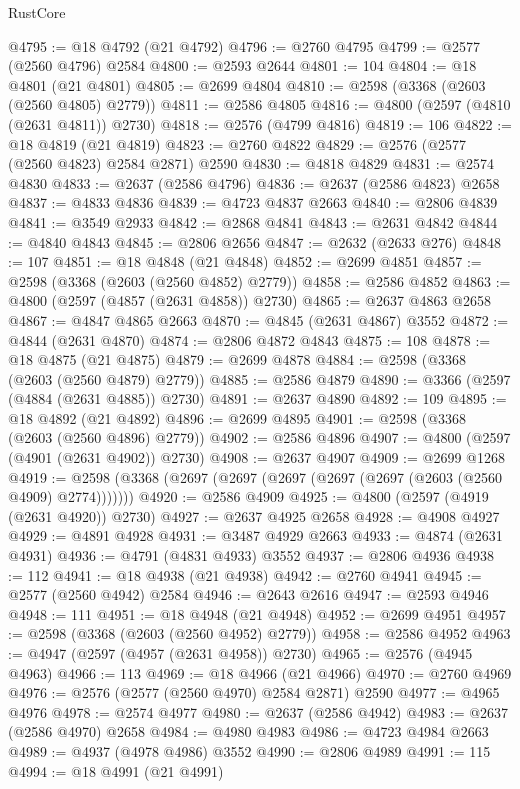 \begin{lexlean}{RustCore}
\begin{coremodule}
@4795 := @18 @4792 (@21 @4792)
@4796 := @2760 @4795
@4799 := @2577 (@2560 @4796) @2584
@4800 := @2593 @2644
@4801 := 104
@4804 := @18 @4801 (@21 @4801)
@4805 := @2699 @4804
@4810 := @2598 (@3368 (@2603 (@2560 @4805) @2779))
@4811 := @2586 @4805
@4816 := @4800 (@2597 (@4810 (@2631 @4811)) @2730)
@4818 := @2576 (@4799 @4816)
@4819 := 106
@4822 := @18 @4819 (@21 @4819)
@4823 := @2760 @4822
@4829 := @2576 (@2577 (@2560 @4823) @2584 @2871) @2590
@4830 := @4818 @4829
@4831 := @2574 @4830
@4833 := @2637 (@2586 @4796)
@4836 := @2637 (@2586 @4823) @2658
@4837 := @4833 @4836
@4839 := @4723 @4837 @2663
@4840 := @2806 @4839
@4841 := @3549 @2933
@4842 := @2868 @4841
@4843 := @2631 @4842
@4844 := @4840 @4843
@4845 := @2806 @2656
@4847 := @2632 (@2633 @276)
@4848 := 107
@4851 := @18 @4848 (@21 @4848)
@4852 := @2699 @4851
@4857 := @2598 (@3368 (@2603 (@2560 @4852) @2779))
@4858 := @2586 @4852
@4863 := @4800 (@2597 (@4857 (@2631 @4858)) @2730)
@4865 := @2637 @4863 @2658
@4867 := @4847 @4865 @2663
@4870 := @4845 (@2631 @4867) @3552
@4872 := @4844 (@2631 @4870)
@4874 := @2806 @4872 @4843
@4875 := 108
@4878 := @18 @4875 (@21 @4875)
@4879 := @2699 @4878
@4884 := @2598 (@3368 (@2603 (@2560 @4879) @2779))
@4885 := @2586 @4879
@4890 := @3366 (@2597 (@4884 (@2631 @4885)) @2730)
@4891 := @2637 @4890
@4892 := 109
@4895 := @18 @4892 (@21 @4892)
@4896 := @2699 @4895
@4901 := @2598 (@3368 (@2603 (@2560 @4896) @2779))
@4902 := @2586 @4896
@4907 := @4800 (@2597 (@4901 (@2631 @4902)) @2730)
@4908 := @2637 @4907
@4909 := @2699 @1268
@4919 := @2598 (@3368 (@2697 (@2697 (@2697 (@2697 (@2697 (@2603 (@2560 @4909) @2774)))))))
@4920 := @2586 @4909
@4925 := @4800 (@2597 (@4919 (@2631 @4920)) @2730)
@4927 := @2637 @4925 @2658
@4928 := @4908 @4927
@4929 := @4891 @4928
@4931 := @3487 @4929 @2663
@4933 := @4874 (@2631 @4931)
@4936 := @4791 (@4831 @4933) @3552
@4937 := @2806 @4936
@4938 := 112
@4941 := @18 @4938 (@21 @4938)
@4942 := @2760 @4941
@4945 := @2577 (@2560 @4942) @2584
@4946 := @2643 @2616
@4947 := @2593 @4946
@4948 := 111
@4951 := @18 @4948 (@21 @4948)
@4952 := @2699 @4951
@4957 := @2598 (@3368 (@2603 (@2560 @4952) @2779))
@4958 := @2586 @4952
@4963 := @4947 (@2597 (@4957 (@2631 @4958)) @2730)
@4965 := @2576 (@4945 @4963)
@4966 := 113
@4969 := @18 @4966 (@21 @4966)
@4970 := @2760 @4969
@4976 := @2576 (@2577 (@2560 @4970) @2584 @2871) @2590
@4977 := @4965 @4976
@4978 := @2574 @4977
@4980 := @2637 (@2586 @4942)
@4983 := @2637 (@2586 @4970) @2658
@4984 := @4980 @4983
@4986 := @4723 @4984 @2663
@4989 := @4937 (@4978 @4986) @3552
@4990 := @2806 @4989
@4991 := 115
@4994 := @18 @4991 (@21 @4991)

\end{coremodule}
\end{lexlean}
